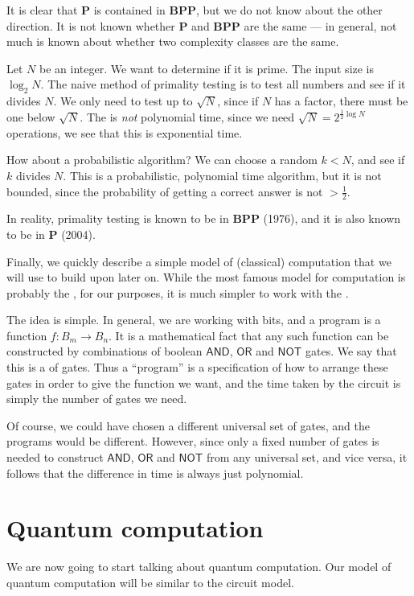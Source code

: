 \documentclass[a4paper]{article}
\newcommand{\AND}{\mathsf{AND}}
\newcommand{\NOT}{\mathsf{NOT}}
\newcommand{\OR}{\mathsf{OR}}
\begin{document}
It is clear that \textbf{P} is contained in \textbf{BPP}, but we do not know about the other direction. It is not known whether \textbf{P} and \textbf{BPP} are the same --- in general, not much is known about whether two complexity classes are the same.

\begin{eg}
  Let $N$ be an integer. We want to determine if it is prime. The input size is $\log_2 N$. The naive method of primality testing is to test all numbers and see if it divides $N$. We only need to test up to $\sqrt{N}$, since if $N$ has a factor, there must be one below $\sqrt{N}$. The is \emph{not} polynomial time, since we need $\sqrt{N} = 2^{\frac{1}{2} \log N}$ operations, we see that this is exponential time.

  How about a probabilistic algorithm? We can choose a random $k < N$, and see if $k$ divides $N$. This is a probabilistic, polynomial time algorithm, but it is not bounded, since the probability of getting a correct answer is not $> \frac{1}{2}$.

  In reality, primality testing is known to be in \textbf{BPP} (1976), and it is also known to be in \textbf{P} (2004).
\end{eg}

Finally, we quickly describe a simple model of (classical) computation that we will use to build upon later on. While the most famous model for computation is probably the , for our purposes, it is much simpler to work with the .

The idea is simple. In general, we are working with bits, and a program is a function $f: B_m \to B_n$. It is a mathematical fact that any such function can be constructed by combinations of boolean $\AND$, $\OR$ and $\NOT$ gates. We say that this is a  of gates. Thus a ``program'' is a specification of how to arrange these gates in order to give the function we want, and the time taken by the circuit is simply the number of gates we need.

Of course, we could have chosen a different universal set of gates, and the programs would be different. However, since only a fixed number of gates is needed to construct $\AND$, $\OR$ and $\NOT$ from any universal set, and vice versa, it follows that the difference in time is always just polynomial.

\section{Quantum computation}
We are now going to start talking about quantum computation. Our model of quantum computation will be similar to the circuit model.
\end{document}

